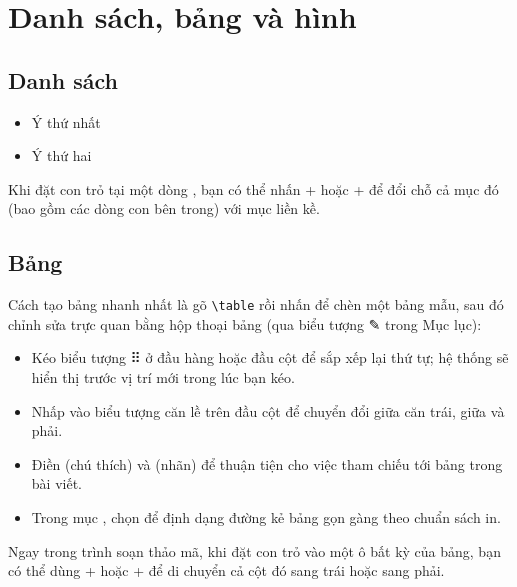 \section{Danh sách, bảng và hình}
\label{sec:khoi}

\subsection{Danh sách}
\begin{ma}
\begin{itemize}        %
  \item Ý thứ nhất
  \item Ý thứ hai
\end{itemize}
\end{ma}

\begin{meo}
Khi đặt con trỏ tại một dòng , bạn có thể nhấn +
hoặc + để đổi chỗ cả mục đó (bao gồm các dòng con bên trong)
với mục liền kề.
\end{meo}

\subsection{Bảng}
Cách tạo bảng nhanh nhất là gõ \texttt{\textbackslash table} rồi nhấn
 để chèn một bảng mẫu, sau đó chỉnh sửa trực quan bằng hộp thoại
bảng (qua biểu tượng ✎ trong Mục lục):


\begin{itemize}
  \item Kéo biểu tượng ⠿ ở đầu hàng hoặc đầu cột để sắp xếp lại thứ tự; hệ
    thống sẽ hiển thị trước vị trí mới trong lúc bạn kéo.
  \item Nhấp vào biểu tượng căn lề trên đầu cột để chuyển đổi giữa căn trái,
    giữa và phải.
  \item Điền  (chú thích) và  (nhãn) để thuận tiện cho
    việc tham chiếu tới bảng trong bài viết.
  \item Trong mục , chọn  để định dạng đường kẻ
    bảng gọn gàng theo chuẩn sách in.
\end{itemize}

\begin{meo}
Ngay trong trình soạn thảo mã, khi đặt con trỏ vào một ô bất kỳ của bảng, bạn
có thể dùng + hoặc + để di chuyển cả cột đó
sang trái hoặc sang phải.
\end{meo}

